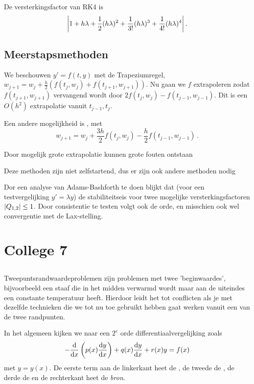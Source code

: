 \documentclass{2wn20summary}
\begin{document}
			De versterkingsfactor van RK4 is 
			\[ 
				{\left|1+h \lambda + \frac{1}{2}(h \lambda)^2 + \frac{1}{3!}(h\lambda)^3 + \frac{1}{4!}(h\lambda)^4 \right|}\,.
				\]
				
		\subsection{Meerstapsmethoden}
			We beschouwen $y'=f(t,y)$ met de Trapeziumregel, $w_{j+1} = w_j + \frac{h}{2} (f(t_j,w_j) + f(t_{j+1}, w_{j+1}))$. Nu gaan we $f$ extrapoleren zodat $f(t_{j+1}, w_{j+1})$ vervangend wordt door $2f(t_j,w_j)-f(t_{j-1},w_{j-1})$. Dit is een $O(h^2)$ extrapolatie vanuit $t_{j-1},t_j$.
			
			Een andere mogelijkheid is , met
			\[ 
				w_{j+1} = w_j + \frac{3h}{2} f(t_j,w_j) - \frac{h}{2} f(t_{j-1},w_{j-1}) \,.
			 \]
			 \begin{opm}
			 	Door mogelijk grote extrapolatie kunnen grote fouten ontstaan
			 \end{opm}
			 \begin{opm}
				 Deze methoden zijn niet zelfstartend, dus er zijn ook andere methoden nodig
			 \end{opm}
			 
			 Dor een analyse van Adams-Bashforth te doen blijkt dat (voor een testvergelijking $y'=\lambda y$) de stabiliteitseis voor twee mogelijke versterkingsfactoren ${\left|Q_{1,2}\right|} \le 1$. Door consistentie te testen volgt ook de orde, en misschien ook wel convergentie met de Lax-stelling.
		                  

	\section{College 7}
	
		\subsection{}
		Tweepuntsrandwaardeproblemen zijn problemen met twee 'beginwaardes', bijvoorbeeld een staaf die in het midden verwarmd wordt maar aan de uiteindes een constante temperatuur heeft. Hierdoor leidt het tot conflicten als je met dezelfde technieken die we tot nu toe gebruikt hebben gaat werken vanuit een van de twee randpunten.
		
		In het algemeen kijken we naar een $2^e$ orde differentiaalvergelijking zoals
		\[ 
			- \frac{\mathop{}\!\mathrm{d}}{\mathop{}\!\mathrm{d} x} \left( p(x) \frac{\mathop{}\!\mathrm{d} y}{\mathop{}\!\mathrm{d} x}\right) + q(x) \frac{\mathop{}\!\mathrm{d} y}{\mathop{}\!\mathrm{d} x} + r(x) y = f(x)
		 \]
		 met $y=y(x)$. De eerste term aan de linkerkant heet de , de tweede de , de derde de  en de rechterkant heet de \textit{bron}.
		 
\end{document}
